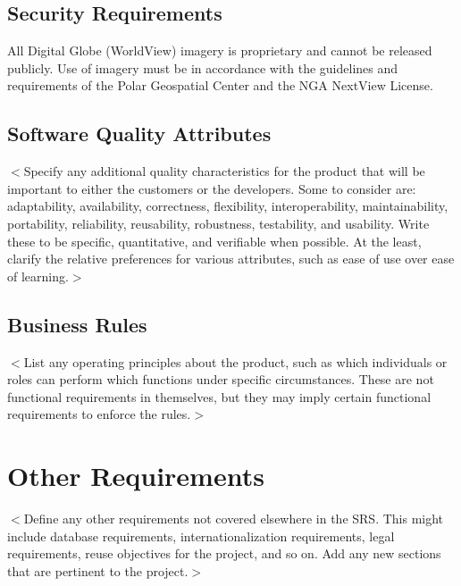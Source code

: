 \documentclass{scrreprt}
\begin{document}
\section{Security Requirements}

All Digital Globe (WorldView) imagery is proprietary and cannot be released publicly. 
Use of imagery must be in accordance with the guidelines and requirements of the Polar 
Geospatial Center and the NGA NextView License. 

\section{Software Quality Attributes}
$<$Specify any additional quality characteristics for the product that will be 
important to either the customers or the developers. Some to consider are: 
adaptability, availability, correctness, flexibility, interoperability, 
maintainability, portability, reliability, reusability, robustness, testability, 
and usability. Write these to be specific, quantitative, and verifiable when 
possible. At the least, clarify the relative preferences for various attributes, 
such as ease of use over ease of learning.$>$

\section{Business Rules}
$<$List any operating principles about the product, such as which individuals or 
roles can perform which functions under specific circumstances. These are not 
functional requirements in themselves, but they may imply certain functional 
requirements to enforce the rules.$>$


\chapter{Other Requirements}
$<$Define any other requirements not covered elsewhere in the SRS. This might 
include database requirements, internationalization requirements, legal 
requirements, reuse objectives for the project, and so on. Add any new sections 
that are pertinent to the project.$>$
\end{document}

